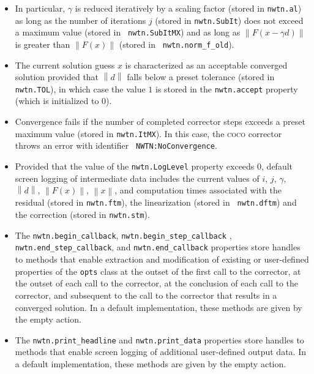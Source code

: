\documentclass{article}
\begin{document}
\begin{itemize}
\item In particular, $\gamma $ is reduced iteratively by a scaling factor
(stored in \texttt{nwtn.al}) as long as the number of iterations $j$ (stored
in \texttt{nwtn.SubIt}) does not exceed a maximum value (stored in \texttt{%
nwtn.SubItMX}) and as long as $\left\| F\left( x-\gamma d\right) \right\| $
is greater than $\left\| F\left( x\right) \right\| $ (stored in \texttt{%
nwtn.norm\_f\_old}).

\item The current solution guess $x$ is characterized as an acceptable
converged solution provided that $\left\| d\right\| $ falls below a preset
tolerance (stored in \texttt{nwtn.TOL}), in which case the value $1$ is
stored in the \texttt{nwtn.accept} property (which is initialized to $0$).

\item Convergence fails if the number of completed corrector steps exceeds a
preset maximum value (stored in \texttt{nwtn.ItMX}). In this case, the 
\textsc{coco} corrector throws an error with identifier \texttt{%
NWTN:NoConvergence}.

\item Provided that the value of the \texttt{nwtn.LogLevel} property exceeds 
$0$, default screen logging of intermediate data includes the current values
of $i$, $j$, $\gamma $, $\left\| d\right\| $, $\left\| F\left( x\right)
\right\| $, $\left\| x\right\| $, and computation times associated with the
residual (stored in \texttt{nwtn.ftm}), the linearization (stored in \texttt{%
nwtn.dftm}) and the correction (stored in \texttt{nwtn.stm}).

\item The \texttt{nwtn.begin\_callback}, \texttt{nwtn.begin\_step\_callback}%
, \texttt{nwtn.end\_step\_callback}, and \texttt{nwtn.end\_callback}
properties store handles to methods that enable extraction and modification
of existing or user-defined properties of the \texttt{opts} class at the
outset of the first call to the corrector, at the outset of each call to the
corrector, at the conclusion of each call to the corrector, and subsequent
to the call to the corrector that results in a converged solution. In a
default implementation, these methods are given by the empty action.

\item The \texttt{nwtn.print\_headline} and \texttt{nwtn.print\_data}
properties store handles to methods that enable screen logging of additional
user-defined output data. In a default implementation, these methods are
given by the empty action.
\end{itemize}
\end{document}
